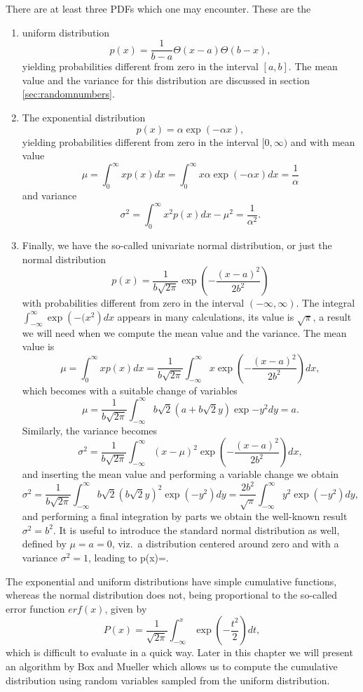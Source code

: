 There are at least three PDFs which one may encounter. These are the
\begin{enumerate}
\item uniform distribution
\[
  p(x)=\frac{1}{b-a}\Theta(x-a)\Theta(b-x),
\]
yielding probabilities different from zero in the interval $[a,b]$.
The mean value and the variance for this distribution are discussed in section 
\ref{sec:randomnumbers}.
\item The exponential distribution
\[
  p(x)=\alpha \exp{(-\alpha x)},
\]
yielding probabilities different from zero in the interval $[0,\infty)$ and with mean value
\[ \mu = \int_0^{\infty}xp(x)dx=\int_0^{\infty}x\alpha \exp{(-\alpha x)}dx=\frac{1}{\alpha}\]
and variance
\[
\sigma^2=\int_0^{\infty}x^2p(x)dx-\mu^2 = \frac{1}{\alpha^2}.
\] 
\item Finally, we have the so-called univariate normal  distribution, or just the normal distribution
\[
   p(x)=\frac{1}{b\sqrt{2\pi}}\exp{\left(-\frac{(x-a)^2}{2b^2}\right)}
\]
with probabilities different from zero in the interval $(-\infty,\infty)$.
The integral $\int_{-\infty}^{\infty}\exp{\left(-(x^2\right)}dx$ appears in many calculations, its value
is $\sqrt{\pi}$,  a result we will need when we compute the mean value and the variance.
The mean value is 
\[  
 \mu = \int_0^{\infty}xp(x)dx=\frac{1}{b\sqrt{2\pi}}\int_{-\infty}^{\infty}x \exp{\left(-\frac{(x-a)^2}{2b^2}\right)}dx,
\]
which becomes with a suitable change of variables 
\[  
 \mu =\frac{1}{b\sqrt{2\pi}}\int_{-\infty}^{\infty}b\sqrt{2}(a+b\sqrt{2}y)\exp{-y^2}dy=a.
\]
Similarly, the variance becomes 
\[  
 \sigma^2 = \frac{1}{b\sqrt{2\pi}}\int_{-\infty}^{\infty}(x-\mu)^2 \exp{\left(-\frac{(x-a)^2}{2b^2}\right)}dx,
\]
and inserting the mean value and performing a variable change we obtain
\[  
 \sigma^2 = \frac{1}{b\sqrt{2\pi}}\int_{-\infty}^{\infty}b\sqrt{2}(b\sqrt{2}y)^2\exp{\left(-y^2\right)}dy=
\frac{2b^2}{\sqrt{\pi}}\int_{-\infty}^{\infty}y^2\exp{\left(-y^2\right)}dy,
\]
and performing a final integration by parts we obtain the well-known result $\sigma^2=b^2$.
It is useful to introduce the standard normal distribution as well, defined by $\mu=a=0$, viz.~a distribution
centered around zero and with a variance $\sigma^2=1$, leading to
\be
   p(x)=.
\ee
\end{enumerate}

The exponential and uniform distributions have simple cumulative functions,
whereas the normal distribution does not, being proportional to the so-called
error function $erf(x)$, given by
\[ 
P(x) = \frac{1}{\sqrt{2\pi}}\int_{-\infty}^x\exp{\left(-\frac{t^2}{2}\right)}dt,
\]
which is difficult to evaluate in a quick way. Later in this chapter we will present an algorithm
by Box and Mueller which allows us to compute the cumulative distribution using 
random variables sampled from the uniform distribution.




